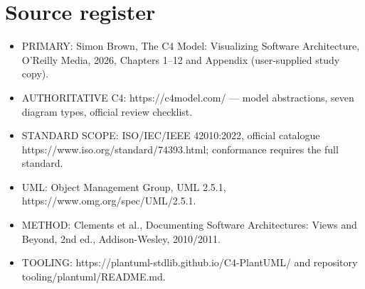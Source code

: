 \documentclass[10pt,letterpaper]{article}
\begin{document}
\section{Source register}
\begin{itemize}
\item PRIMARY: Simon Brown, The C4 Model: Visualizing Software Architecture, O’Reilly Media, 2026, Chapters 1–12 and Appendix (user-supplied study copy).
\item AUTHORITATIVE C4: https://c4model.com/ — model abstractions, seven diagram types, official review checklist.
\item STANDARD SCOPE: ISO/IEC/IEEE 42010:2022, official catalogue https://www.iso.org/standard/74393.html; conformance requires the full standard.
\item UML: Object Management Group, UML 2.5.1, https://www.omg.org/spec/UML/2.5.1.
\item METHOD: Clements et al., Documenting Software Architectures: Views and Beyond, 2nd ed., Addison-Wesley, 2010/2011.
\item TOOLING: https://plantuml-stdlib.github.io/C4-PlantUML/ and repository tooling/plantuml/README.md.
\end{itemize}
\end{document}
